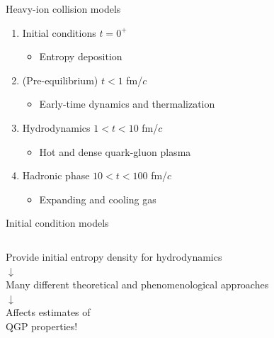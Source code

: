 \documentclass{beamer}
\begin{document}
\begin{frame}[t]{Heavy-ion collision models}
  \eventframes{{,,,,,,}}
  \medskip
  \begin{enumerate}
    \item Initial conditions \hfill $t = 0^+$ \\
      \begin{itemize}
        \item Entropy deposition
      \end{itemize}
    \item (Pre-equilibrium) \hfill $t < 1$ fm/$c$
      \begin{itemize}
        \item Early-time dynamics and thermalization
      \end{itemize}
    \item Hydrodynamics \hfill $1 < t < 10$ fm/$c$
      \begin{itemize}
        \item Hot and dense quark-gluon plasma
      \end{itemize}
    \item Hadronic phase \hfill $10 < t < 100$ fm/$c$
      \begin{itemize}
        \item Expanding and cooling gas
      \end{itemize}
  \end{enumerate}
\end{frame}

\begin{frame}[t]{Initial condition models}
  \bigskip
  \begin{columns}
    \centering
    Provide initial entropy density for hydrodynamics
    \\[1ex] $\downarrow$ \\[1ex]
    Many different theoretical and phenomenological approaches
    \\[1ex] $\downarrow$ \\[1ex]
    Affects estimates of \\ QGP properties!
    \centering
  \end{columns}
\end{frame}
\end{document}
